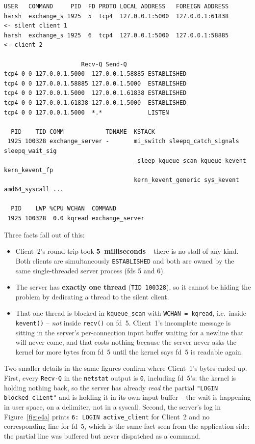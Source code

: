 \documentclass[11pt,a4paper]{article}
\begin{document}
\begin{lstlisting}
USER   COMMAND     PID  FD PROTO LOCAL ADDRESS   FOREIGN ADDRESS
harsh  exchange_s 1925  5  tcp4  127.0.0.1:5000  127.0.0.1:61838     <- silent client 1
harsh  exchange_s 1925  6  tcp4  127.0.0.1:5000  127.0.0.1:58885     <- client 2

                      Recv-Q Send-Q
tcp4 0 0 127.0.0.1.5000  127.0.0.1.58885 ESTABLISHED
tcp4 0 0 127.0.0.1.58885 127.0.0.1.5000  ESTABLISHED
tcp4 0 0 127.0.0.1.5000  127.0.0.1.61838 ESTABLISHED
tcp4 0 0 127.0.0.1.61838 127.0.0.1.5000  ESTABLISHED
tcp4 0 0 127.0.0.1.5000  *.*             LISTEN

  PID    TID COMM            TDNAME  KSTACK
 1925 100328 exchange_server -       mi_switch sleepq_catch_signals sleepq_wait_sig
                                     _sleep kqueue_scan kqueue_kevent kern_kevent_fp
                                     kern_kevent_generic sys_kevent amd64_syscall ...

  PID    LWP %CPU WCHAN  COMMAND
 1925 100328  0.0 kqread exchange_server
\end{lstlisting}

Three facts fall out of this:

\begin{itemize}[leftmargin=1.4em,itemsep=2pt]
  \item Client~2's round trip took \textbf{5~milliseconds} -- there is no stall of any
        kind.  Both clients are simultaneously \texttt{ESTABLISHED} and both are owned
        by the same single-threaded server process (fds 5 and 6).
  \item The server has \textbf{exactly one thread} (\texttt{TID 100328}), so it cannot
        be hiding the problem by dedicating a thread to the silent client.
  \item That one thread is blocked in \texttt{kqueue\_scan} with
        \texttt{WCHAN = kqread}, i.e.\ inside \texttt{kevent()} -- \emph{not} inside
        \texttt{recv()} on fd~5.  Client~1's incomplete message is sitting in the
        server's per-connection input buffer waiting for a newline that will never come,
        and that costs nothing because the server never asks the kernel for more bytes
        from fd~5 until the kernel says fd~5 is readable again.
\end{itemize}

Two smaller details in the same figures confirm where Client~1's bytes ended up.  First,
every \texttt{Recv-Q} in the \texttt{netstat} output is \texttt{0}, including fd~5's:
the kernel is holding nothing back, so the server has already \emph{read} the partial
\texttt{"LOGIN blocked\_client"} and is holding it in its own input buffer -- the wait is
happening in user space, on a delimiter, not in a syscall.  Second, the server's log in
Figure~\ref{fig:e4a} prints \texttt{6: LOGIN active\_client} for Client~2 and no
corresponding line for fd~5, which is the same fact seen from the application side: the
partial line was buffered but never dispatched as a command.
\end{document}
